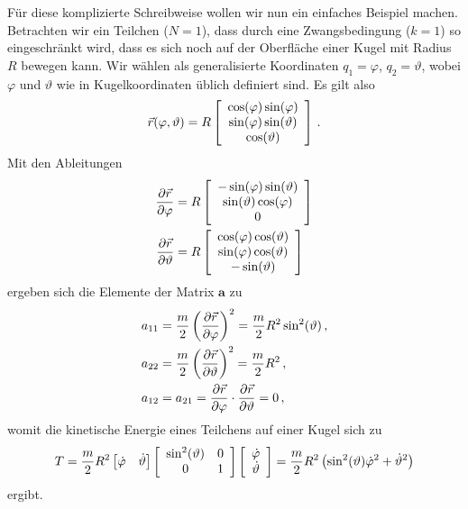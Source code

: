 \documentclass[paper=a4, fontsize=11.0pt, abstractoff, DIV12]{scrartcl}
\begin{document}
Für diese komplizierte Schreibweise wollen wir nun ein einfaches Beispiel
machen. Betrachten wir ein Teilchen ($N=1$), dass durch eine Zwangsbedingung
($k=1$) so eingeschränkt wird, dass es sich noch auf der Oberfläche einer Kugel
mit Radius $R$ bewegen kann. Wir wählen als generalisierte Koordinaten
$q_1 = \varphi$, $q_2 = \vartheta$, wobei $\varphi$ und $\vartheta$ wie in
Kugelkoordinaten üblich definiert sind. Es gilt also
\begin{equation}
\vec r(\varphi, \vartheta) = R\DreierVec{\cos(\varphi)\sin(\varphi)}{\sin(\varphi)\sin(\vartheta)}{\cos(\vartheta)}\,.
\end{equation}
Mit den Ableitungen
\begin{align}
\firstpderiv{\vec{r}}{\varphi} &= R\DreierVec{-\sin(\varphi)\sin(\vartheta)}{\sin(\vartheta)\cos(\varphi)}{0}\\
\firstpderiv{\vec{r}}{\vartheta} &= R\DreierVec{\cos(\varphi)\cos(\vartheta)}{\sin(\varphi)\cos(\vartheta)}{-\sin(\vartheta)}
\end{align}
ergeben sich die Elemente der Matrix $\mathbf{a}$ zu
\begin{align}
a_{11} &= \frac{m}{2} \left(\firstpderiv{\vec r}{\varphi}\right)^2 = \frac{m}{2} R^2 \sin^2(\vartheta)\, ,\\
a_{22} &= \frac{m}{2} \left(\firstpderiv{\vec r}{\vartheta}\right)^2 = \frac{m}{2} R^2\, ,\\
a_{12} &= a_{21} = \firstpderiv{\vec r}{\varphi}\cdot\firstpderiv{\vec r}{\vartheta} = 0\, ,
\end{align}
womit die kinetische Energie eines Teilchens auf einer Kugel sich zu
\begin{equation}
T = \frac{m}{2}R^2 \left[ \dot\varphi\quad\dot\vartheta \right] \left[ \begin{array}{cc} \sin^2(\vartheta) & 0 \\ 0 & 1 \end{array} \right] \left[ \begin{array}{c} \dot\varphi \\ \dot\vartheta \end{array} \right] = \frac{m}{2} R^2 \left(\sin^2(\vartheta)\dot{\varphi}^2 + \dot{\vartheta}^2\right)
\end{equation}
ergibt.
\end{document}

